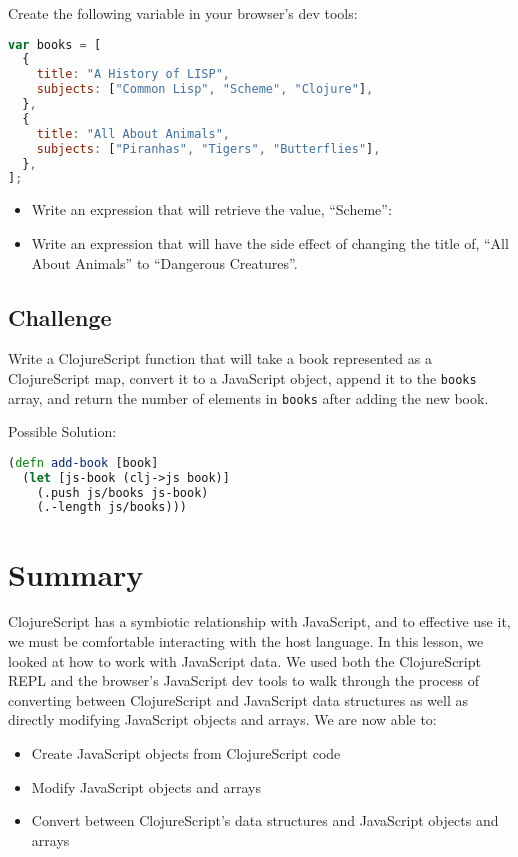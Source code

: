 \documentclass[10pt,twoside,openright]{memoir}
\begin{document}
Create the following variable in your browser's dev tools:

\begin{lstlisting}[language=JavaScript]
var books = [
  {
    title: "A History of LISP",
    subjects: ["Common Lisp", "Scheme", "Clojure"],
  },
  {
    title: "All About Animals",
    subjects: ["Piranhas", "Tigers", "Butterflies"],
  },
];
\end{lstlisting}

\begin{itemize}
\tightlist
\item
  Write an expression that will retrieve the value, ``Scheme'':
\item
  Write an expression that will have the side effect of changing the
  title of, ``All About Animals'' to ``Dangerous Creatures''.
\end{itemize}


\subsection{Challenge}

Write a ClojureScript function that will take a book represented as a
ClojureScript map, convert it to a JavaScript object, append it to the
\texttt{books} array, and return the number of elements in
\texttt{books} after adding the new book.

Possible Solution:

\begin{lstlisting}[language=Clojure]
(defn add-book [book]
  (let [js-book (clj->js book)]
    (.push js/books js-book)
    (.-length js/books)))
\end{lstlisting}

\section{Summary}

ClojureScript has a symbiotic relationship with JavaScript, and to
effective use it, we must be comfortable interacting with the host
language. In this lesson, we looked at how to work with JavaScript data.
We used both the ClojureScript REPL and the browser's JavaScript dev
tools to walk through the process of converting between ClojureScript
and JavaScript data structures as well as directly modifying JavaScript
objects and arrays. We are now able to:

\begin{itemize}
\tightlist
\item
  Create JavaScript objects from ClojureScript code
\item
  Modify JavaScript objects and arrays
\item
  Convert between ClojureScript's data structures and JavaScript objects
  and arrays
\end{itemize}
\end{document}
